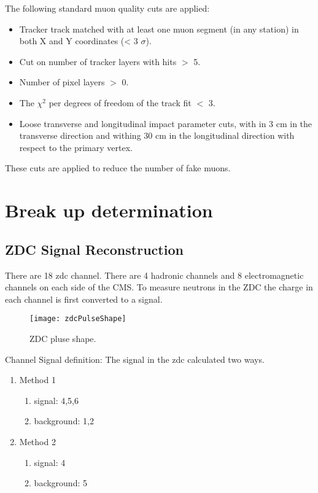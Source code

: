       The following standard muon quality cuts are applied:
      \begin{itemize}
        \item Tracker track matched with at least one muon segment 
          (in any station) in both X and Y coordinates (< 3 $\sigma$).
        \item Cut on number of tracker layers with hits $>$ 5.
        \item Number of pixel layers $>$ 0.
        \item The $\chi^{2}$ per degrees of freedom of the track fit $<$ 3. 
        \item Loose transverse and longitudinal impact parameter cuts, with in 3 
          cm in the transverse direction and withing 30 cm in the longitudinal 
          direction with respect to the primary vertex.
      \end{itemize}
      These cuts are applied to reduce the number of fake muons.
  
  \section{\label{sec:breakUpDet} Break up determination}
    \subsection{ZDC Signal Reconstruction}
      There are 18 zdc channel. 
      There are 4 hadronic channels and 8 electromagnetic channels on each side
        of the CMS. 
      To measure neutrons in the ZDC the charge in each channel is first 
        converted to a signal. 

	\begin{figure}[h]
		\centering
		\texttt{[image: zdcPulseShape]}
		\caption{ZDC pluse shape.}
		\label{fig:zdcPulseShape}
	\end{figure}

      Channel Signal definition:
      The signal in the zdc calculated two ways. 
      \begin{enumerate}
	\item Method 1
	\begin{enumerate}
	  \item signal: 4,5,6 
          \item background: 1,2
        \end{enumerate}
	\item Method 2
	\begin{enumerate}
	  \item signal: 4
	  \item background: 5
        \end{enumerate}
      \end{enumerate}

